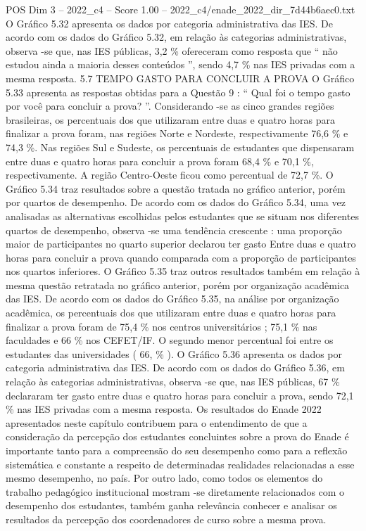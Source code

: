 \begin{textsample}{POS Dim 3 – 2022\_c4 – Score 1.00 – 2022\_c4/enade\_2022\_dir\_7d44b6aec0.txt}
O Gráfico 5.32 apresenta os dados por categoria administrativa das IES.
De acordo com os dados do Gráfico 5.32, em relação às categorias administrativas, observa -se que, nas IES públicas, 3,2 \% ofereceram como resposta que “ não estudou ainda a maioria desses conteúdos ”, sendo 4,7 \% nas IES privadas com a mesma resposta. 5.7 TEMPO GASTO PARA CONCLUIR A PROVA O Gráfico 5.33 apresenta as respostas obtidas para a Questão 9 : “ Qual foi o tempo gasto por você para concluir a prova? ”.
Considerando -se as cinco grandes regiões brasileiras, os percentuais dos que utilizaram entre duas e quatro horas para finalizar a prova foram, nas regiões Norte e Nordeste, respectivamente 76,6 \% e 74,3 \%.
Nas regiões Sul e Sudeste, os percentuais de estudantes que dispensaram entre duas e quatro horas para concluir a prova foram 68,4 \% e 70,1 \%, respectivamente.
A região Centro-Oeste ficou como percentual de 72,7 \%.
O Gráfico 5.34 traz resultados sobre a questão tratada no gráfico anterior, porém por quartos de desempenho.
De acordo com os dados do Gráfico 5.34, uma vez analisadas as alternativas escolhidas pelos estudantes que se situam nos diferentes quartos de desempenho, observa -se uma tendência crescente : uma proporção maior de participantes no quarto superior declarou ter gasto Entre duas e quatro horas para concluir a prova quando comparada com a proporção de participantes nos quartos inferiores.
O Gráfico 5.35 traz outros resultados também em relação à mesma questão retratada no gráfico anterior, porém por organização acadêmica das IES.
De acordo com os dados do Gráfico 5.35, na análise por organização acadêmica, os percentuais dos que utilizaram entre duas e quatro horas para finalizar a prova foram de 75,4 \% nos centros universitários ; 75,1 \% nas faculdades e 66 \% nos CEFET/IF.
O segundo menor percentual foi entre os estudantes das universidades ( 66, \% ).
O Gráfico 5.36 apresenta os dados por categoria administrativa das IES.
De acordo com os dados do Gráfico 5.36, em relação às categorias administrativas, observa -se que, nas IES públicas, 67 \% declararam ter gasto entre duas e quatro horas para concluir a prova, sendo 72,1 \% nas IES privadas com a mesma resposta.
Os resultados do Enade 2022 apresentados neste capítulo contribuem para o entendimento de que a consideração da percepção dos estudantes concluintes sobre a prova do Enade é importante tanto para a compreensão do seu desempenho como para a reflexão sistemática e constante a respeito de determinadas realidades relacionadas a esse mesmo desempenho, no país.
Por outro lado, como todos os elementos do trabalho pedagógico institucional mostram -se diretamente relacionados com o desempenho dos estudantes, também ganha relevância conhecer e analisar os resultados da percepção dos coordenadores de curso sobre a mesma prova.

\end{textsample}
